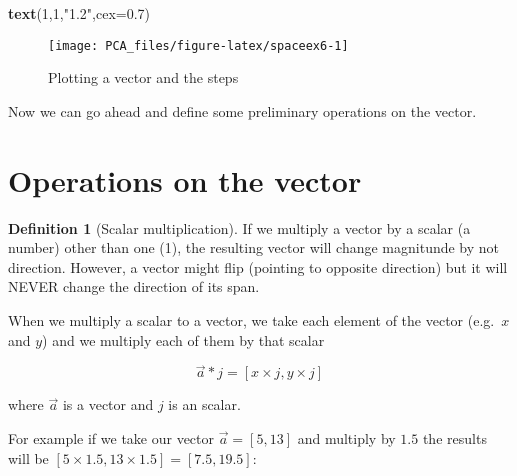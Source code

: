 \documentclass[
]{book}
\newenvironment{Shaded}{\begin{snugshade}}{\end{snugshade}}
\newcommand{\DataTypeTok}[1]{\textcolor[rgb]{0.13,0.29,0.53}{#1}}
\newcommand{\DecValTok}[1]{\textcolor[rgb]{0.00,0.00,0.81}{#1}}
\newcommand{\FloatTok}[1]{\textcolor[rgb]{0.00,0.00,0.81}{#1}}
\newcommand{\KeywordTok}[1]{\textcolor[rgb]{0.13,0.29,0.53}{\textbf{#1}}}
\newcommand{\NormalTok}[1]{#1}
\newcommand{\StringTok}[1]{\textcolor[rgb]{0.31,0.60,0.02}{#1}}
\theoremstyle{definition}
\newtheorem{definition}{Definition}[chapter]
\theoremstyle{definition}
\theoremstyle{definition}
\theoremstyle{remark}
\begin{document}
\begin{Shaded}
\begin{Highlighting}[]
\KeywordTok{text}\NormalTok{(}\DecValTok{1}\NormalTok{,}\DecValTok{1}\NormalTok{,}\StringTok{"1.2"}\NormalTok{,}\DataTypeTok{cex=}\FloatTok{0.7}\NormalTok{)}
\end{Highlighting}
\end{Shaded}

\begin{figure}

{\centering \texttt{[image: PCA\_files/figure-latex/spaceex6-1]} 

}

\caption{Plotting a vector and the steps}\label{fig:spaceex6}
\end{figure}

Now we can go ahead and define some preliminary operations on the vector.

\hypertarget{operations-on-the-vector}{%
\section{Operations on the vector}\label{operations-on-the-vector}}

\begin{definition}[Scalar multiplication]
\protect\hypertarget{def:scalarv}{}{\label{def:scalarv} \iffalse (Scalar multiplication) \fi{} }If we multiply a vector by a scalar (a number) other than one (1), the resulting vector will change magnitunde by not direction. However, a vector might flip (pointing to opposite direction) but it will NEVER change the direction of its span.

When we multiply a scalar to a vector, we take each element of the vector (e.g.~\(x\) and \(y\)) and we multiply each of them by that scalar

\[\vec{a}*j=[x\times j,y\times j]\]

where \(\vec{a}\) is a vector and \(j\) is an scalar.
\end{definition}

For example if we take our vector \(\vec{a}=[5,13]\) and multiply by \(1.5\) the results will be \([5 \times 1.5, 13 \times 1.5]=[7.5,19.5]\):
\end{document}
